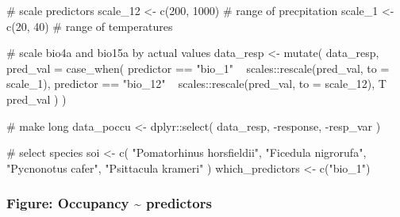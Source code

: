 \documentclass[
]{article}
\newenvironment{Shaded}{}{}
\newcommand{\CommentTok}[1]{\textcolor[rgb]{0.00,0.50,0.00}{#1}}
\newcommand{\DataTypeTok}[1]{#1}
\newcommand{\DecValTok}[1]{#1}
\newcommand{\KeywordTok}[1]{\textcolor[rgb]{0.00,0.00,1.00}{#1}}
\newcommand{\NormalTok}[1]{#1}
\newcommand{\OperatorTok}[1]{#1}
\newcommand{\StringTok}[1]{\textcolor[rgb]{0.00,0.50,0.50}{#1}}
\begin{document}
\begin{Shaded}
\begin{Highlighting}[]
\CommentTok{# scale predictors}
\NormalTok{scale_}\DecValTok{12}\NormalTok{ <-}\StringTok{ }\KeywordTok{c}\NormalTok{(}\DecValTok{200}\NormalTok{, }\DecValTok{1000}\NormalTok{) }\CommentTok{# range of precpitation}
\NormalTok{scale_}\DecValTok{1}\NormalTok{ <-}\StringTok{ }\KeywordTok{c}\NormalTok{(}\DecValTok{20}\NormalTok{, }\DecValTok{40}\NormalTok{) }\CommentTok{# range of temperatures}

\CommentTok{# scale bio4a and bio15a by actual values}
\NormalTok{data_resp <-}\StringTok{ }\KeywordTok{mutate}\NormalTok{(}
\NormalTok{  data_resp,}
  \DataTypeTok{pred_val =} \KeywordTok{case_when}\NormalTok{(}
\NormalTok{    predictor }\OperatorTok{==}\StringTok{ "bio_1"} \OperatorTok{~}\StringTok{ }\NormalTok{scales}\OperatorTok{::}\KeywordTok{rescale}\NormalTok{(pred_val, }\DataTypeTok{to =}\NormalTok{ scale_}\DecValTok{1}\NormalTok{),}
\NormalTok{    predictor }\OperatorTok{==}\StringTok{ "bio_12"} \OperatorTok{~}\StringTok{ }\NormalTok{scales}\OperatorTok{::}\KeywordTok{rescale}\NormalTok{(pred_val, }\DataTypeTok{to =}\NormalTok{ scale_}\DecValTok{12}\NormalTok{),}
\NormalTok{    T }\OperatorTok{~}\StringTok{ }\NormalTok{pred_val}
\NormalTok{  )}
\NormalTok{)}

\CommentTok{# make long}
\NormalTok{data_poccu <-}\StringTok{ }\NormalTok{dplyr}\OperatorTok{::}\KeywordTok{select}\NormalTok{(}
\NormalTok{  data_resp,}
  \OperatorTok{-}\NormalTok{response, }\OperatorTok{-}\NormalTok{resp_var}
\NormalTok{)}
\end{Highlighting}
\end{Shaded}

\begin{Shaded}
\begin{Highlighting}[]
\CommentTok{# select species}
\NormalTok{soi <-}\StringTok{ }\KeywordTok{c}\NormalTok{(}
  \StringTok{"Pomatorhinus horsfieldii"}\NormalTok{, }\StringTok{"Ficedula nigrorufa"}\NormalTok{,}
  \StringTok{"Pycnonotus cafer"}\NormalTok{, }\StringTok{"Psittacula krameri"}
\NormalTok{)}
\NormalTok{which_predictors <-}\StringTok{ }\KeywordTok{c}\NormalTok{(}\StringTok{"bio_1"}\NormalTok{)}
\end{Highlighting}
\end{Shaded}

\hypertarget{figure-occupancy-predictors}{%
\subsubsection{Figure: Occupancy \textasciitilde{} predictors}\label{figure-occupancy-predictors}}
\end{document}

